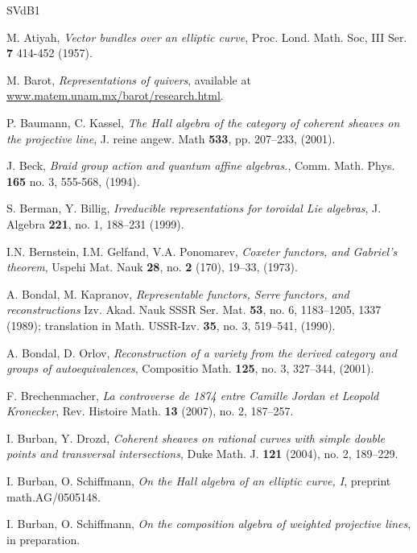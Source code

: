\documentclass[a4paper,10pt]{amsart}
\numberwithin{equation}{section}
\begin{document}
{\vspace{.2in}

\small{\begin{thebibliography}{SVdB1}

M. Atiyah, \emph{Vector bundles over an elliptic curve}, Proc. Lond. Math. Soc, III Ser. \textbf{7} 414-452 (1957).

M. Barot, \emph{Representations of quivers}, available at \url{www.matem.unam.mx/barot/research.html}.

P. Baumann, C. Kassel, \emph{The Hall algebra of the category of coherent sheaves on the projective line}, J. reine angew. Math \textbf{533}, pp. 207--233, (2001).

J. Beck, \emph{Braid group action and quantum affine algebras.},
Comm. Math. Phys. \textbf{165} no. 3, 555-568, (1994).

S. Berman, Y. Billig, \emph{Irreducible representations for toroidal Lie algebras}, J. Algebra \textbf{221}, no. 1, 188--231 (1999).

 I.N. Bernstein, I.M. Gelfand, V.A. Ponomarev, \emph{Coxeter functors, and Gabriel's theorem}, Uspehi Mat. Nauk \textbf{28}, no. \textbf{2} (170), 19--33, (1973).

A. Bondal, M. Kapranov, \emph{Representable functors, Serre functors, and reconstructions} Izv. Akad. Nauk SSSR Ser. Mat. \textbf{53}, no. 6, 1183--1205, 1337 (1989); translation in Math. USSR-Izv. \textbf{35}, no. 3, 519--541, (1990).

A. Bondal, D. Orlov, \emph{Reconstruction of a variety from the derived category and groups of autoequivalences}, Compositio Math. \textbf{125}, no. 3, 327--344, (2001).

F. Brechenmacher, \emph{La controverse de 1874 entre Camille Jordan et Leopold Kronecker}, Rev. Histoire Math. \textbf{13} (2007), no. 2, 187--257.

I. Burban, Y. Drozd, \emph{ Coherent sheaves on rational curves with simple double points and transversal intersections}, Duke Math. J. \textbf{121} (2004), no. 2, 189--229.

I. Burban, O. Schiffmann, \emph{On the Hall algebra of an elliptic curve, I}, preprint math.AG/0505148.

I. Burban, O. Schiffmann, \emph{On the composition algebra of weighted projective lines}, in preparation.


\end{thebibliography}}}
\end{document}
